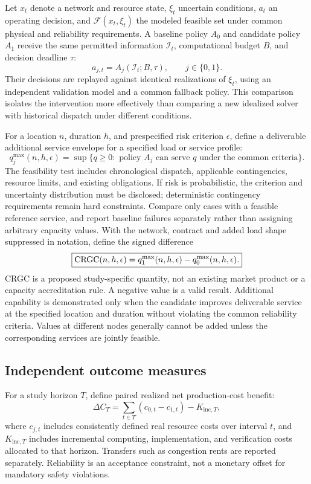\documentclass[11pt,letterpaper]{article}
\begin{document}
Let $x_t$ denote a network and resource state, $\xi_t$ uncertain conditions, $a_t$ an operating decision, and $\mathcal{F}(x_t,\xi_t)$ the modeled feasible set under common physical and reliability requirements. A baseline policy $A_0$ and candidate policy $A_1$ receive the same permitted information $\mathcal{I}_t$, computational budget $B$, and decision deadline $\tau$:
\begin{equation}
a_{j,t}=A_j(\mathcal{I}_t;B,\tau),\qquad j\in\{0,1\}.
\label{eq:policy}
\end{equation}
Their decisions are replayed against identical realizations of $\xi_t$, using an independent validation model and a common fallback policy. This comparison isolates the intervention more effectively than comparing a new idealized solver with historical dispatch under different conditions.

For a location $n$, duration $h$, and prespecified risk criterion $\epsilon$, define a deliverable additional service envelope for a specified load or service profile:
\begin{equation}
q^{\mathrm{max}}_j(n,h,\epsilon)=\sup\{q\geq0:\text{ policy }A_j\text{ can serve }q
\text{ under the common criteria}\}.
\end{equation}
The feasibility test includes chronological dispatch, applicable contingencies, resource limits, and existing obligations. If risk is probabilistic, the criterion and uncertainty distribution must be disclosed; deterministic contingency requirements remain hard constraints. Compare only cases with a feasible reference service, and report baseline failures separately rather than assigning arbitrary capacity values. With the network, contract and added load shape suppressed in notation, define the signed difference
\begin{equation}
\boxed{\operatorname{CRGC}(n,h,\epsilon)=q^{\mathrm{max}}_1(n,h,\epsilon)-q^{\mathrm{max}}_0(n,h,\epsilon).}
\label{eq:crgc_nodal}
\end{equation}
CRGC is a proposed study-specific quantity, not an existing market product or a capacity accreditation rule. A negative value is a valid result. Additional capability is demonstrated only when the candidate improves deliverable service at the specified location and duration without violating the common reliability criteria. Values at different nodes generally cannot be added unless the corresponding services are jointly feasible.

\subsection{Independent outcome measures}
For a study horizon $T$, define paired realized net production-cost benefit:
\begin{equation}
\Delta C_T=\sum_{t\in T}(c_{0,t}-c_{1,t})-K_{\mathrm{inc},T},
\end{equation}
where $c_{j,t}$ includes consistently defined real resource costs over interval $t$, and $K_{\mathrm{inc},T}$ includes incremental computing, implementation, and verification costs allocated to that horizon. Transfers such as congestion rents are reported separately. Reliability is an acceptance constraint, not a monetary offset for mandatory safety violations.
\end{document}
